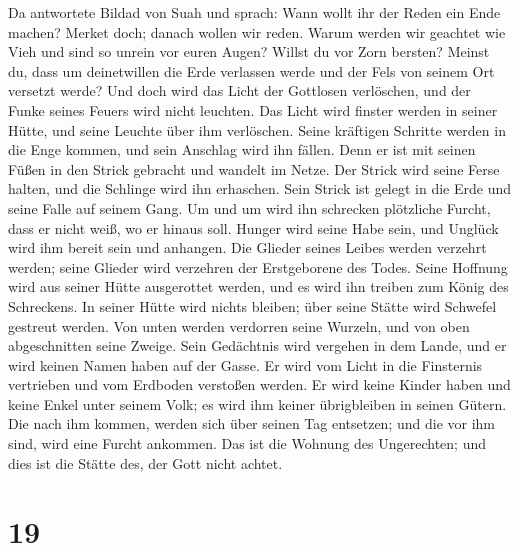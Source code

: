  Da antwortete Bildad von Suah und sprach: 
Wann wollt ihr der Reden ein Ende machen? Merket doch; danach wollen wir
reden.  Warum werden wir geachtet wie Vieh und sind so
unrein vor euren Augen?  Willst du vor Zorn bersten?
Meinst du, dass um deinetwillen die Erde verlassen werde und der Fels
von seinem Ort versetzt werde?  Und doch wird das Licht
der Gottlosen verlöschen, und der Funke seines Feuers wird nicht
leuchten.  Das Licht wird finster werden in seiner Hütte,
und seine Leuchte über ihm verlöschen.  Seine kräftigen
Schritte werden in die Enge kommen, und sein Anschlag wird ihn fällen.
 Denn er ist mit seinen Füßen in den Strick gebracht und
wandelt im Netze.  Der Strick wird seine Ferse halten, und
die Schlinge wird ihn erhaschen.  Sein Strick ist gelegt
in die Erde und seine Falle auf seinem Gang.  Um und um
wird ihn schrecken plötzliche Furcht, dass er nicht weiß, wo er hinaus
soll.  Hunger wird seine Habe sein, und Unglück wird ihm
bereit sein und anhangen.  Die Glieder seines Leibes
werden verzehrt werden; seine Glieder wird verzehren der Erstgeborene
des Todes.  Seine Hoffnung wird aus seiner Hütte
ausgerottet werden, und es wird ihn treiben zum König des Schreckens.
 In seiner Hütte wird nichts bleiben; über seine Stätte
wird Schwefel gestreut werden.  Von unten werden
verdorren seine Wurzeln, und von oben abgeschnitten seine Zweige.
 Sein Gedächtnis wird vergehen in dem Lande, und er wird
keinen Namen haben auf der Gasse.  Er wird vom Licht in
die Finsternis vertrieben und vom Erdboden verstoßen werden.
 Er wird keine Kinder haben und keine Enkel unter seinem
Volk; es wird ihm keiner übrigbleiben in seinen Gütern. 
Die nach ihm kommen, werden sich über seinen Tag entsetzen; und die vor
ihm sind, wird eine Furcht ankommen.  Das ist die Wohnung
des Ungerechten; und dies ist die Stätte des, der Gott nicht achtet.

\hypertarget{section-18}{%
\section{19}\label{section-18}}

